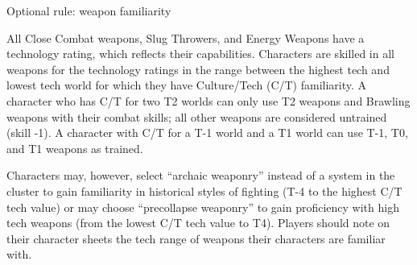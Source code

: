 \begin{sidebox}{Optional rule: weapon familiarity}

All Close Combat weapons, Slug Throwers, and Energy Weapons have a technology rating, which reflects their capabilities. Characters are skilled in all weapons for the technology ratings in the range between the highest tech and lowest tech world for which they have Culture/Tech (C/T) familiarity. A character who has C/T for two T2 worlds can only use T2 weapons and Brawling weapons with their combat skills; all other weapons are considered untrained (skill -1). A character with C/T for a T-1 world and a T1 world can use T-1, T0, and T1 weapons as trained.

Characters may, however, select ``archaic weaponry'' instead of a system in the cluster to gain familiarity in historical styles of fighting (T-4 to the highest C/T tech value) or may choose ``precollapse weaponry'' to gain proficiency with high tech weapons (from the lowest C/T tech value to T4). Players should note on their character sheets the tech range of weapons their characters are familiar with.
\end{sidebox}